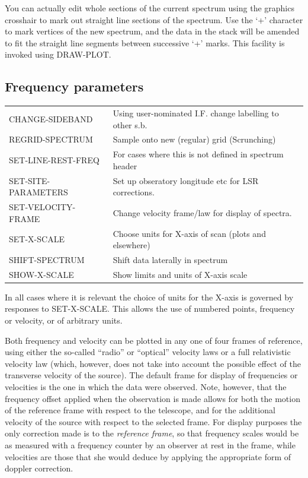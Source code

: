 \documentclass[11pt,twoside]{report}
\begin{document}
You can actually edit whole sections of the current spectrum using the graphics crosshair to mark out straight line sections of
the spectrum. Use the `+' character to mark vertices of the new spectrum, and
the data in the stack will be amended to fit the straight line segments between
successive `+' marks\index{+}. This facility is invoked using DRAW-PLOT.

\subsection{Frequency parameters}

\label{frames}
\begin{tabular}{ll}
CHANGE-SIDEBAND        & Using user-nominated I.F. change labelling to other s.b.\\
REGRID-SPECTRUM        & Sample onto new (regular) grid (Scrunching) \\
SET-LINE-REST-FREQ     & For cases where this is not defined in spectrum header\\
SET-SITE-PARAMETERS    & Set up obseratory longitude etc for LSR corrections.\\
SET-VELOCITY-FRAME     & Change velocity frame/law for display of spectra.\\
SET-X-SCALE            & Choose units for X-axis of scan (plots and elsewhere)\\
SHIFT-SPECTRUM         & Shift data laterally in spectrum\\
SHOW-X-SCALE            & Show limits and units of X-axis scale\\
\end{tabular}

In all cases where it is relevant the choice of units for the X-axis is
  
 governed by responses to SET-X-SCALE. This allows the
use of numbered points, frequency or velocity, or of arbitrary units.

Both frequency and velocity can be plotted in any one of four frames of
reference, using either the so-called ``radio'' or ``optical'' velocity laws
or a full relativistic velocity law (which, however, does not take into account
the possible effect of the transverse velocity of the source). The default
frame for display of frequencies or velocities is the one in which the data
were observed. Note, however, that the frequency offset applied when the
observation is made allows for both the motion of the reference frame with
respect to the telescope, and for the additional velocity of the source with
respect to the selected frame. For display purposes the only correction made
is to the {\em reference frame}, so that frequency scales would be as measured
with a frequency counter by an observer at rest in the frame, while velocities
are those that she would deduce by applying the appropriate form of doppler
correction.
\end{document}
